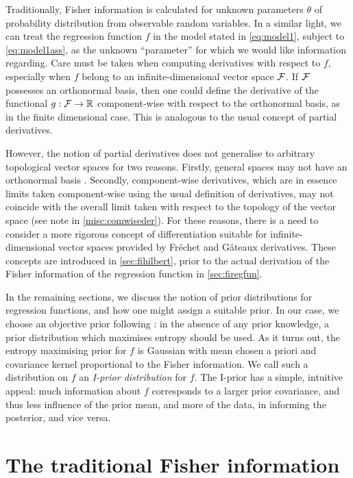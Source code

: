 \documentclass[a4paper,showframe,11pt]{report}
\begin{document}
\label{chapter3}

Traditionally, Fisher information is calculated for unknown parameters $\theta$ of probability distribution from observable random variables.
In a similar light, we can treat the regression function $f$ in the model stated in \cref{eq:model1}, subject to \cref{eq:model1ass}, as the unknown ``parameter'' for which we would like information regarding.
Care must be taken when computing derivatives with respect to $f$, especially when $f$ belong to an infinite-dimensional vector space ${\mathcal F}$.
If ${\mathcal F}$ possesses an orthonormal basis, then one could define the derivative of the functional $g:{\mathcal F}\to\mathbb{R}$ component-wise with respect to the orthonormal basis, as in the finite dimensional case.
This is analogous to the usual concept of   partial derivatives.

However, the notion of partial derivatives does not generalise to arbitrary topological vector spaces for two reasons.
Firstly, general spaces may not have an orthonormal basis \citep[§5, pp. 76]{tapia1971diff}.
Secondly, component-wise derivatives, which are in essence limits taken component-wise using the usual definition of derivatives, may not coincide with the overall limit taken with respect to the topology of the vector space (see note in \cref{misc:comwiseder}).
For these reasons, there is a need to consider a more rigorous concept of differentiation suitable for infinite-dimensional vector spaces provided by Fréchet and Gâteaux derivatives.
These concepts are introduced in \cref{sec:fihilbert}, prior to the actual derivation of the Fisher information of the regression function in \cref{sec:firegfun}.

In the remaining sections, we discuss the notion of prior distributions for regression functions, and how one might assign a suitable prior.
In our case, we choose an objective prior following \citep{jaynes1957a,jaynes1957b}: in the absence of any prior knowledge, a prior distribution which maximises entropy should be used.
As it turns out, the entropy maximising prior for $f$ is Gaussian with mean chosen a priori and covariance kernel proportional to the Fisher information.
We call such a distribution on $f$ an \emph{I-prior distribution} for $f$.
The I-prior has a simple, intuitive appeal: much information about $f$ corresponds to a larger prior covariance, and thus less influence of the prior mean, and more of the data, in informing the posterior, and vice versa.

\section{The traditional Fisher information}

\end{document}
